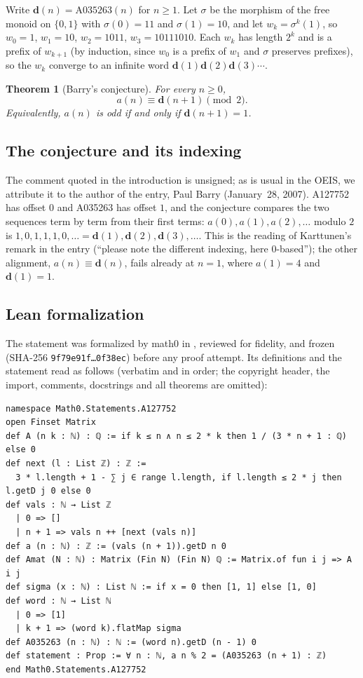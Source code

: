 \documentclass[11pt]{amsart}
\theoremstyle{plain}
\newtheorem{theorem}{Theorem}
\theoremstyle{definition}
\newcommand{\pd}{\mathbf{d}}
\begin{document}
Write $\pd(n)=\mathrm{A035263}(n)$ for $n\ge1$. Let $\sigma$ be the morphism of the free monoid on $\{0,1\}$ with $\sigma(0)=11$ and $\sigma(1)=10$, and let $w_k=\sigma^k(1)$, so $w_0=1$, $w_1=10$, $w_2=1011$, $w_3=10111010$. Each $w_k$ has length $2^k$ and is a prefix of $w_{k+1}$ (by induction, since $w_0$ is a prefix of $w_1$ and $\sigma$ preserves prefixes), so the $w_k$ converge to an infinite word $\pd(1)\pd(2)\pd(3)\cdots$.

\begin{theorem}[Barry's conjecture]\label{thm:main}
For every $n\ge0$,
\[
  a(n)\equiv \pd(n+1)\pmod 2 .
\]
Equivalently, $a(n)$ is odd if and only if $\pd(n+1)=1$.
\end{theorem}

\subsection*{The conjecture and its indexing}
The comment quoted in the introduction is unsigned; as is usual in the OEIS, we attribute it to the author of the entry, Paul Barry (January~28, 2007). A127752 has offset $0$ and A035263 has offset $1$, and the conjecture compares the two sequences term by term from their first terms: $a(0),a(1),a(2),\dots$ modulo $2$ is $1,0,1,1,1,0,\dots=\pd(1),\pd(2),\pd(3),\dots$. This is the reading of Karttunen's remark in the entry (``please note the different indexing, here 0-based''); the other alignment, $a(n)\equiv\pd(n)$, fails already at $n=1$, where $a(1)=4$ and $\pd(1)=1$.

\subsection*{Lean formalization}
The statement was formalized by math0 in , reviewed for fidelity, and frozen (SHA-256 \texttt{9f79e91f\ldots 0f38ec}) before any proof attempt. Its definitions and the statement read as follows (verbatim and in order; the copyright header, the import, comments, docstrings and all theorems are omitted):
\begin{lstlisting}
namespace Math0.Statements.A127752
open Finset Matrix
def A (n k : ℕ) : ℚ := if k ≤ n ∧ n ≤ 2 * k then 1 / (3 * n + 1 : ℚ) else 0
def next (l : List ℤ) : ℤ :=
  3 * l.length + 1 - ∑ j ∈ range l.length, if l.length ≤ 2 * j then l.getD j 0 else 0
def vals : ℕ → List ℤ
  | 0 => []
  | n + 1 => vals n ++ [next (vals n)]
def a (n : ℕ) : ℤ := (vals (n + 1)).getD n 0
def Amat (N : ℕ) : Matrix (Fin N) (Fin N) ℚ := Matrix.of fun i j => A i j
def sigma (x : ℕ) : List ℕ := if x = 0 then [1, 1] else [1, 0]
def word : ℕ → List ℕ
  | 0 => [1]
  | k + 1 => (word k).flatMap sigma
def A035263 (n : ℕ) : ℕ := (word n).getD (n - 1) 0
def statement : Prop := ∀ n : ℕ, a n % 2 = (A035263 (n + 1) : ℤ)
end Math0.Statements.A127752
\end{lstlisting}
\end{document}

